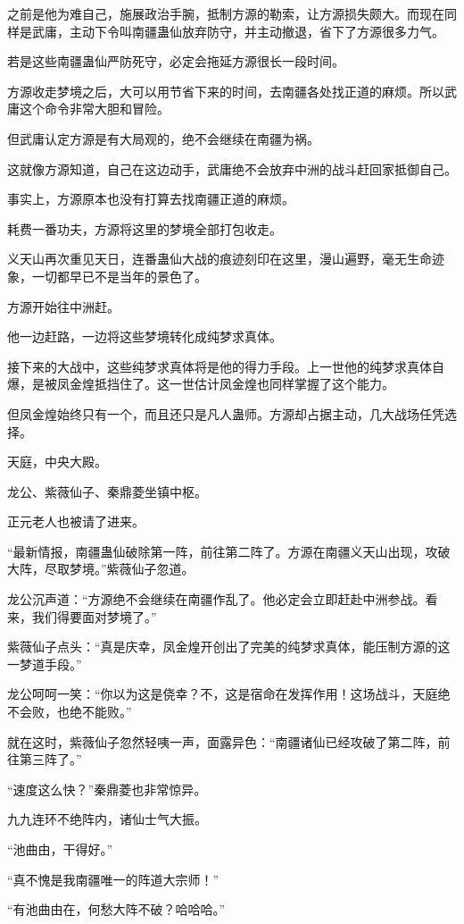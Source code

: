 \begin{this_body}
之前是他为难自己，施展政治手腕，抵制方源的勒索，让方源损失颇大。而现在同样是武庸，主动下令叫南疆蛊仙放弃防守，并主动撤退，省下了方源很多力气。

若是这些南疆蛊仙严防死守，必定会拖延方源很长一段时间。

方源收走梦境之后，大可以用节省下来的时间，去南疆各处找正道的麻烦。所以武庸这个命令非常大胆和冒险。

但武庸认定方源是有大局观的，绝不会继续在南疆为祸。

这就像方源知道，自己在这边动手，武庸绝不会放弃中洲的战斗赶回家抵御自己。

事实上，方源原本也没有打算去找南疆正道的麻烦。

耗费一番功夫，方源将这里的梦境全部打包收走。

义天山再次重见天日，连番蛊仙大战的痕迹刻印在这里，漫山遍野，毫无生命迹象，一切都早已不是当年的景色了。

方源开始往中洲赶。

他一边赶路，一边将这些梦境转化成纯梦求真体。

接下来的大战中，这些纯梦求真体将是他的得力手段。上一世他的纯梦求真体自爆，是被凤金煌抵挡住了。这一世估计凤金煌也同样掌握了这个能力。

但凤金煌始终只有一个，而且还只是凡人蛊师。方源却占据主动，几大战场任凭选择。

天庭，中央大殿。

龙公、紫薇仙子、秦鼎菱坐镇中枢。

正元老人也被请了进来。

“最新情报，南疆蛊仙破除第一阵，前往第二阵了。方源在南疆义天山出现，攻破大阵，尽取梦境。”紫薇仙子忽道。

龙公沉声道：“方源绝不会继续在南疆作乱了。他必定会立即赶赴中洲参战。看来，我们得要面对梦境了。”

紫薇仙子点头：“真是庆幸，凤金煌开创出了完美的纯梦求真体，能压制方源的这一梦道手段。”

龙公呵呵一笑：“你以为这是侥幸？不，这是宿命在发挥作用！这场战斗，天庭绝不会败，也绝不能败。”

就在这时，紫薇仙子忽然轻咦一声，面露异色：“南疆诸仙已经攻破了第二阵，前往第三阵了。”

“速度这么快？”秦鼎菱也非常惊异。

九九连环不绝阵内，诸仙士气大振。

“池曲由，干得好。”

“真不愧是我南疆唯一的阵道大宗师！”

“有池曲由在，何愁大阵不破？哈哈哈。”


\end{this_body}
